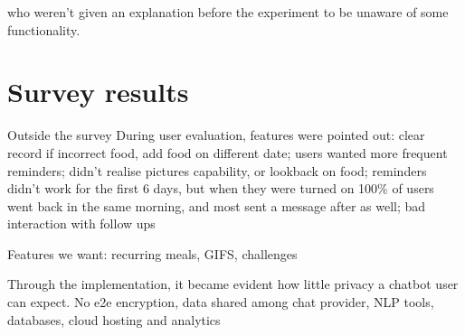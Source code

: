 who weren't given an explanation before the experiment to be unaware of some functionality.

\section{Survey results}





Outside the survey During user evaluation, features were pointed out: clear record if incorrect food, add food on different date; users wanted more frequent reminders; didn't realise pictures capability, or lookback on food; reminders didn't work for the first 6 days, but when they were turned on 100\% of users went back in the same morning, and most sent a message after as well; bad interaction with follow ups

Features we want: recurring meals, GIFS, challenges


Through the implementation, it became evident how little privacy a chatbot user can expect. No e2e encryption, data shared among chat provider, NLP tools, databases, cloud hosting and analytics

